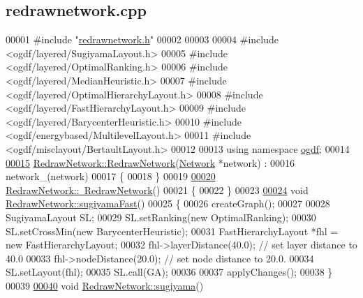 \hypertarget{redrawnetwork_8cpp_source}{}\subsection{redrawnetwork.\+cpp}
\label{redrawnetwork_8cpp_source}

\begin{DoxyCode}
00001 \textcolor{preprocessor}{#include "\hyperlink{redrawnetwork_8h}{redrawnetwork.h}"}
00002 
00003 
00004 \textcolor{preprocessor}{#include <ogdf/layered/SugiyamaLayout.h>}
00005 \textcolor{preprocessor}{#include <ogdf/layered/OptimalRanking.h>}
00006 \textcolor{preprocessor}{#include <ogdf/layered/MedianHeuristic.h>}
00007 \textcolor{preprocessor}{#include <ogdf/layered/OptimalHierarchyLayout.h>}
00008 \textcolor{preprocessor}{#include <ogdf/layered/FastHierarchyLayout.h>}
00009 \textcolor{preprocessor}{#include <ogdf/layered/BarycenterHeuristic.h>}
00010 \textcolor{preprocessor}{#include <ogdf/energybased/MultilevelLayout.h>}
00011 \textcolor{preprocessor}{#include <ogdf/misclayout/BertaultLayout.h>}
00012 
00013 \textcolor{keyword}{using namespace }\hyperlink{namespaceogdf}{ogdf};
00014 
\hypertarget{redrawnetwork_8cpp_source_l00015}{}\hyperlink{class_redraw_network_a1fe3edb8c57780eb62f7de8f03dfeda3}{00015} \hyperlink{class_redraw_network_a1fe3edb8c57780eb62f7de8f03dfeda3}{RedrawNetwork::RedrawNetwork}(\hyperlink{class_network}{Network} *network) :
00016   network\_(network)
00017 \{
00018 \}
00019 
\hypertarget{redrawnetwork_8cpp_source_l00020}{}\hyperlink{class_redraw_network_ac7b5f7fdb2b88e7d8bb580834e93b1e8}{00020} \hyperlink{class_redraw_network_ac7b5f7fdb2b88e7d8bb580834e93b1e8}{RedrawNetwork::~RedrawNetwork}()
00021 \{
00022 \}
00023 
\hypertarget{redrawnetwork_8cpp_source_l00024}{}\hyperlink{class_redraw_network_a94d53ddf8ee00c4ef6d56bb988333103}{00024} \textcolor{keywordtype}{void} \hyperlink{class_redraw_network_a94d53ddf8ee00c4ef6d56bb988333103}{RedrawNetwork::sugiyamaFast}()
00025 \{
00026   createGraph();
00027 
00028   SugiyamaLayout SL;
00029   SL.setRanking(\textcolor{keyword}{new} OptimalRanking);
00030   SL.setCrossMin(\textcolor{keyword}{new} BarycenterHeuristic);
00031   FastHierarchyLayout *fhl = \textcolor{keyword}{new} FastHierarchyLayout;
00032   fhl->layerDistance(40.0);    \textcolor{comment}{// set layer distance to 40.0}
00033   fhl->nodeDistance(20.0); \textcolor{comment}{// set node distance to 20.0.}
00034   SL.setLayout(fhl);
00035   SL.call(GA);
00036 
00037   applyChanges();
00038 \}
00039 
\hypertarget{redrawnetwork_8cpp_source_l00040}{}\hyperlink{class_redraw_network_aee0ae606982145e66bba825421d610f8}{00040} \textcolor{keywordtype}{void} \hyperlink{class_redraw_network_aee0ae606982145e66bba825421d610f8}{RedrawNetwork::sugiyama}()

\end{DoxyCode}
